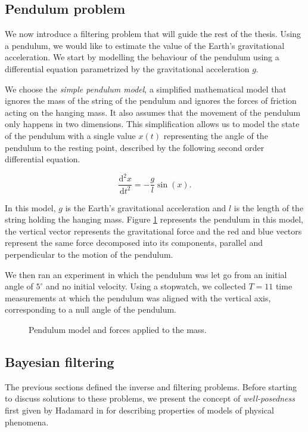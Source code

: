 \subsection{Pendulum problem}

We now introduce a filtering problem that will guide the rest of the thesis. Using a pendulum, we would like to estimate the value of the Earth's gravitational acceleration. We start by modelling the behaviour of the pendulum using a differential equation parametrized by the gravitational acceleration $g$.

We choose the \textit{simple pendulum model}, a simplified mathematical model that ignores the mass of the string of the pendulum and ignores the forces of friction acting on the hanging mass. It also assumes that the movement of the pendulum only happens in two dimensions. This simplification allows us to model the state of the pendulum with a single value $x(t)$ representing the angle of the pendulum to the resting point, described by the following second order differential equation.

\begin{equation}\label{pendulum-ode}
  \frac{\text{d}^2x}{\text{d}t^2} = -\frac{g}{l}\sin(x).
\end{equation}

In this model, $g$ is the Earth's gravitational acceleration and $l$ is the length of the string holding the hanging mass. Figure \ref{pendulum-fig} represents the pendulum in this model, the vertical vector represents the gravitational force and the red and blue vectors represent the same force decomposed into its components, parallel and perpendicular to the motion of the pendulum.


We then ran an experiment in which the pendulum was let go from an initial angle of $5^\circ$ and no initial velocity. Using a stopwatch, we collected $T=11$ time measurements at which the pendulum was aligned with the vertical axis, corresponding to a null angle of the pendulum.

\begin{figure}\label{pendulum-fig}
  \centering
  
  \caption{Pendulum model and forces applied to the mass.   }
\end{figure}

\subsection{Bayesian filtering}

The previous sections defined the inverse and filtering problems. Before starting to discuss solutions to these problems, we present the concept of \textit{well-posedness} first given by Hadamard in \cite{hadamard} for describing properties of models of physical phenomena.

